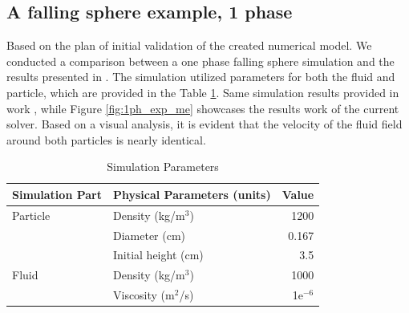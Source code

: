 \subsection{A falling sphere example, 1 phase}
Based on the plan of initial validation of the created numerical model. We conducted a comparison between a one phase falling sphere simulation and the results presented in \cite{nan2023high}. The simulation utilized parameters for both the fluid and particle, which are provided in the {Table \ref{table1-chap4}}. Same simulation results provided in work \cite{nan2023high}, while Figure \ref{fig:1ph_exp_me} showcases the results work of the current solver. Based on a visual analysis, it is evident that the velocity of the fluid field around both particles is nearly identical. 

\begin{table}[H]
    \centering
    \caption{Simulation Parameters} \label{table1-chap4}
    \begin{tabular}{llr}
        \toprule
        \hline
        Simulation Part         & Physical Parameters (units) & Value \\
        \hline
        \midrule
        Particle                 & Density (kg/m$^3$)          & 1200    \\
                         & Diameter (cm)          & 0.167    \\
                         & Initial height (cm)          & 3.5    \\
                         \hline
        Fluid                  & Density (kg/m$^3$)           & 1000   \\
                                & Viscosity (m$^2$/s)         & 1e$^{-6}$    \\
                                \hline
        \bottomrule
     \end{tabular}
\end{table}
%

